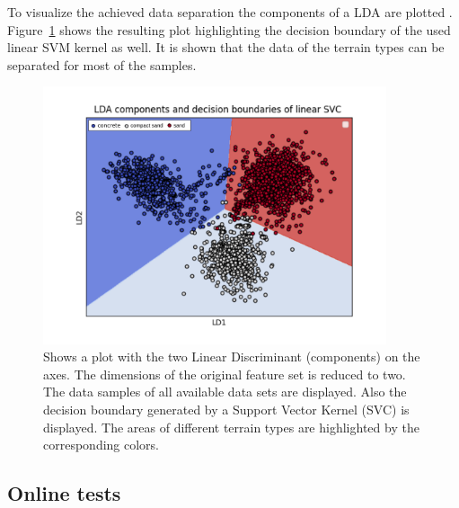 \documentclass{article}
\begin{document}
To visualize the achieved data separation the components of a LDA are plotted . Figure~\ref{fig:lda} shows the resulting plot highlighting the decision boundary of the used linear SVM kernel as well. It is shown that the data of the terrain types can be separated for most of the samples.
\begin{figure}[!htb]
 \centering
 \includegraphics[width=0.9\textwidth]{../figures/boundary_LDA_prevTesting_all_sand_concrete_compactsand.png}
 \caption{Shows a plot with the two Linear Discriminant (components) on the axes. The dimensions of the original feature set is reduced to two. The data samples of all available data sets are displayed. Also the decision boundary generated by a Support Vector Kernel (SVC) is displayed. The areas of different terrain types are highlighted by the corresponding colors. }
 \label{fig:lda}
\end{figure}








\subsection{Online tests}
\end{document}
